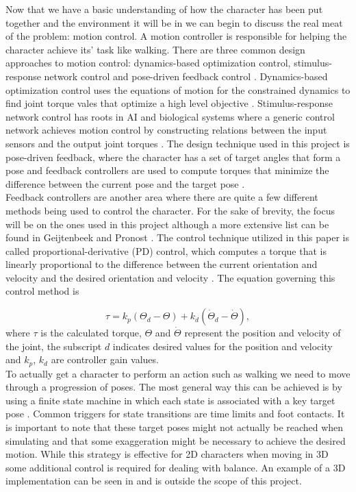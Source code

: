 \documentclass[12pt, a4paper]{article}
\begin{document}
Now that we have a basic understanding of how the character has been put together and the environment it will be in we can begin to discuss the real meat of the problem: motion control. A motion controller is responsible for helping the character achieve its' task like walking. There are three common design approaches to motion control: dynamics-based optimization control, stimulus-response network control and pose-driven feedback control \cite{Geijtenbeek}. Dynamics-based optimization control uses the equations of motion for the constrained dynamics to find joint torque vales that optimize a high level objective \cite{dynamics_control}. Stimulus-response network control has roots in AI and biological systems where a generic control network achieves motion control by constructing relations between the input sensors and the output joint torques \cite{Geijtenbeek}. The design technique used in this project is pose-driven feedback, where the character has a set of target angles that form a pose and feedback controllers are used to compute torques that minimize the difference between the current pose and the target pose \cite{walking_survey}. \\

Feedback controllers are another area where there are quite a few different methods being used to control the character. For the sake of brevity, the focus will be on the ones used in this project although a more extensive list can be found in Geijtenbeek and Pronost \cite{Geijtenbeek}. The control technique utilized in this paper is called proportional-derivative (PD) control, which computes a torque that is linearly proportional to the difference between the current orientation and velocity and the desired orientation and velocity \cite{walking_survey}. The equation governing this control method is 

\begin{equation}
\tau = k_p(\Theta_d - \Theta) + k_d(\dot\Theta_d -\dot\Theta),
\label{eqn: pd control}
\end{equation} 
\noindent
where $\tau$ is the calculated torque, $\Theta$ and $\dot\Theta$ represent the position and velocity of the joint, the subscript $d$ indicates desired values for the position and velocity and $k_p$, $k_d$ are controller gain values.\\

To actually get a character to perform an action such as walking we need to move through a progression of poses. The most general way this can be achieved is by using a finite state machine in which each state is associated with a key target pose \cite{Geijtenbeek}. Common triggers for state transitions are time limits and foot contacts. It is important to note that these target poses might not actually be reached when simulating and that some exaggeration might be necessary to achieve the desired motion. While this strategy is effective for 2D characters when moving in 3D some additional control is required for dealing with balance. An example of a 3D implementation can be seen in \cite{Yin07} and is outside the scope of this project.  
\end{document}

